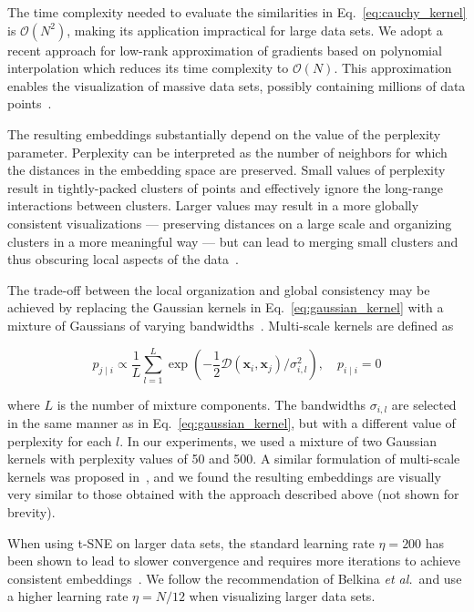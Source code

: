 \documentclass[runningheads]{llncs}
\newcommand{\etal}{\textit{et al.}}
\begin{document}
The time complexity needed to evaluate the similarities in
Eq.~\ref{eq:cauchy_kernel} is $\mathcal{O}(N^2)$, making its application
impractical for large data sets. We adopt a recent approach for low-rank
approximation of gradients based on polynomial interpolation which reduces its
time complexity to $\mathcal{O}(N)$. This approximation enables the
visualization of massive data sets, possibly containing millions of data
points~\cite{Linderman2019}.

The resulting embeddings substantially depend on the value of the perplexity
parameter. Perplexity can be interpreted as the number of neighbors for which
the distances in the embedding space are preserved. Small values of perplexity
result in tightly-packed clusters of points and effectively ignore the
long-range interactions between clusters. Larger values may result in a more
globally consistent visualizations --- preserving distances on a large scale and
organizing clusters in a more meaningful way --- but can lead to merging small
clusters and thus obscuring local aspects of the data~\cite{Kobak2019}.

The trade-off between the local organization and global consistency may be
achieved by replacing the Gaussian kernels in Eq.~\ref{eq:gaussian_kernel} with
a mixture of Gaussians of varying bandwidths~\cite{Lee2015}. Multi-scale kernels
are defined as

\begin{equation}
p_{j \mid i} \propto \frac{1}{L} \sum_{l=1}^{L} \exp \left ( - \frac{1}{2} \mathcal{D}(\mathbf{x}_i, \mathbf{x}_j ) / \sigma_{i,l}^2 \right ), \quad p_{i \mid i} = 0
\label{eq:multiscale}
\end{equation}

\noindent where $L$ is the number of mixture components. The bandwidths
$\sigma_{i,l}$ are selected in the same manner as in
Eq.~\ref{eq:gaussian_kernel}, but with a different value of perplexity for each
$l$. In our experiments, we used a mixture of two Gaussian kernels with
perplexity values of 50 and 500. A similar formulation of multi-scale kernels
was proposed in~\cite{Kobak2019}, and we found the resulting embeddings are
visually very similar to those obtained with the approach described above (not
shown for brevity).

When using t-SNE on larger data sets, the standard learning rate $\eta = 200$
has been shown to lead to slower convergence and requires more iterations to
achieve consistent embeddings~\cite{Belkina2019}. We follow the recommendation
of Belkina \etal ~and use a higher learning rate $\eta = N / 12$ when
visualizing larger data sets.
\end{document}
